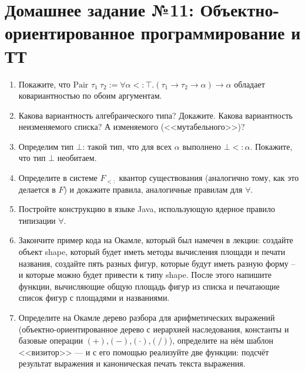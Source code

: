 \documentclass[10pt,a4paper,oneside]{article}
\begin{document}
\section*{Домашнее задание №11: Объектно-ориентированное программирование и ТТ}
\begin{enumerate}
\item Покажите, что $\text{Pair }\tau_1\ \tau_2 := \forall \alpha<:\top.(\tau_1 \rightarrow\tau_2\rightarrow\alpha)\rightarrow\alpha$ обладает ковариантностью по обоим аргументам.
\item Какова вариантность алгебраического типа? Докажите. Какова вариантность неизменяемого списка? А изменяемого (<<мутабельного>>)?
\item Определим тип $\bot$: такой тип, что для всех $\alpha$ выполнено $\bot <: \alpha$. Покажите, что тип $\bot$ необитаем.
\item Определите в системе $F_{<:}$ квантор существования (аналогично тому, как это делается в $F$) и докажите правила, аналогичные правилам для $\forall$.
\item Постройте конструкцию в языке Java, использующую ядерное правило типизации $\forall$.
\item Закончите пример кода на Окамле, который был намечен в лекции: создайте объект shape, который будет иметь 
методы вычисления площади и печати названия, создайте пять разных фигур, которые будут иметь разную форму -- и которые
можно будет привести к типу shape. После этого напишите функции, вычисляющие общую площадь фигур из списка и печатающие
список фигур с площадями и названиями.
\item Определите на Окамле дерево разбора для арифметических выражений (объектно-ориентированное дерево с иерархией наследования,
константы и базовые операции $(+)$,$(-)$,$(\cdot)$,$(/)$), 
определите на нём шаблон <<визитор>> --- и с его помощью реализуйте две функции: подсчёт результат выражения и каноническая 
печать текста выражения.
\end{enumerate}
\end{document}
